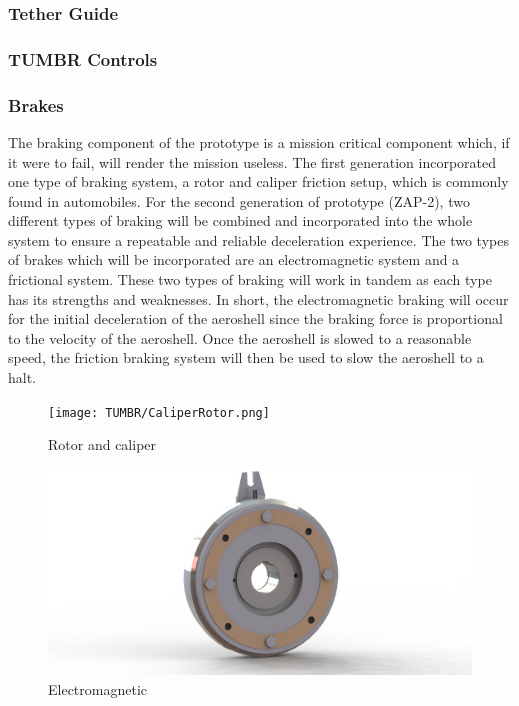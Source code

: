 \subsubsection{Tether Guide}

\subsubsection{TUMBR Controls}

\subsubsection{Brakes}

\indent\indent The braking component of the prototype is a mission critical component which, if it were to fail, will render the mission useless. The first generation incorporated one type of braking system, a rotor and caliper friction setup, which is commonly found in automobiles. For the second generation of prototype (ZAP-2), two different types of braking will be combined and incorporated into the whole system to ensure a repeatable and reliable deceleration experience. The two types of brakes which will be incorporated are an electromagnetic system and a frictional system. These two types of braking will work in tandem as each type has its strengths and weaknesses. In short, the electromagnetic braking will occur for the initial deceleration of the aeroshell since the braking force is proportional to the velocity of the aeroshell. Once the aeroshell is slowed to a reasonable speed, the friction braking system will then be used to slow the aeroshell to a halt.

\begin{figure}[!ht]
\centering
\begin{minipage}{.5\textwidth}
  \centering
  \texttt{[image: TUMBR/CaliperRotor.png]}
  \caption{\label{fig:DiscBrake}Rotor and caliper}
\end{minipage}%
\begin{minipage}{.5\textwidth}
  \centering
  \includegraphics[width=0.9\linewidth]{TUMBR/EM.png}
  \caption{\label{fig:Electro}Electromagnetic}
\end{minipage}
\end{figure}

